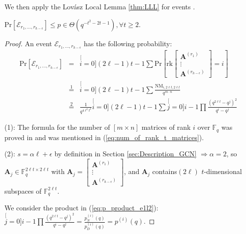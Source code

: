 We then apply the Lov\'asz Local Lemma \ref{thm:LLL} for events
.
\begin{lem}
\label{lem:p_e1l2} $\mathrm{Pr}\left[\mathcal{E}_{r_{1},\ldots,r_{h-\epsilon}}\right]\leq p\in\Theta\left(q^{-t^{2}-2t-1}\right),\forall t\geq2.$
\end{lem}
\begin{proof}
An event $\mathcal{E}_{r_{1},\ldots,r_{h-\epsilon}}$ has the following
probability:
\begin{eqnarray}
\mathrm{Pr}\left[\mathcal{E}_{r_{1},\ldots,r_{h-\epsilon}}\right] & = & \stackrel[i=0]{\left(2\ell-1\right)t-1}{\mathop{\sum}}\mathrm{Pr}\left[\mathrm{rk}\left[\begin{array}{c}
\boldsymbol{A}^{\left(r_{1}\right)}\\
\vdots\\
\boldsymbol{A}^{\left(r_{h-\epsilon}\right)}
\end{array}\right]=i\right]\nonumber \\
 & \overset{1}{=} & \stackrel[i=0]{\left(2\ell-1\right)t-1}{\mathop{\sum}}\frac{\mathrm{NM}_{i,2\ell t,2\ell t}}{q^{m\cdot n}}\nonumber \\
 & \overset{2}{=} & \frac{1}{q^{4\ell^{2}t^{2}}}\stackrel[i=0]{\left(2\ell-1\right)t-1}{\mathop{\sum}}\stackrel[j=0]{i-1}{\mathop{\prod}}\frac{\left(q^{2\ell t}-q^{j}\right)^{2}}{q^{i}-q^{j}}\label{eq:p_product_e1l2}
\end{eqnarray}

(1): The formula for the number of $\left[m\times n\right]$ matrices
of rank $i$ over $\ensuremath{\mathbb{F}}_{q}$ was proved in \cite{Overbeck:2007}
and was mentioned in (\ref{eq:num_of_rank_t_matrices}).

(2): $s=\alpha\ell+\epsilon$ by definition in Section \ref{sec:Description_GCN}
$\Rightarrow\alpha=2$, so $\boldsymbol{A}_{j}\in\ensuremath{\mathbb{F}}_{q}^{2\ell t\times2\ell t}$
with $\boldsymbol{A}_{j}=\left[\begin{array}{c}
\boldsymbol{A}^{\left(r_{1}\right)}\\
\vdots\\
\boldsymbol{A}^{\left(r_{h-\epsilon}\right)}
\end{array}\right]$, and $\boldsymbol{A}_{j}$ contains$\left(2\ell\right)$ $t$-dimensional
subspaces of $\ensuremath{\mathbb{F}}_{q}^{2\ell t}$.

We consider the product in (\ref{eq:p_product_e1l2}): $\stackrel[j=0]{i-1}{\mathop{\prod}}\frac{\left(q^{2\ell t}-q^{j}\right)^{2}}{q^{i}-q^{j}}=\frac{p_{N}^{(i)}(q)}{p_{D}^{(i)}(q)}=p^{(i)}(q)$.


\end{proof}
